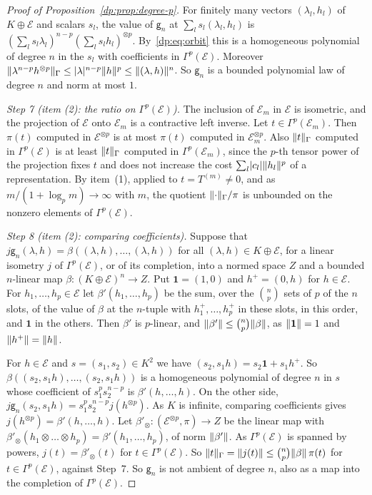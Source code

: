 \begin{proof}[Proof of Proposition~\ref{dp:prop:degree-p}]
For finitely many vectors $(\lambda_l,h_l)$ of $K\oplus\mathcal E$ and scalars $s_l$, the value of $\mathsf g_n$ at $\sum_ls_l(\lambda_l,h_l)$ is $(\sum_ls_l\lambda_l)^{n-p}(\sum_ls_lh_l)^{\otimes p}$. By~\eqref{dp:eq:orbit} this is a homogeneous polynomial of degree $n$ in the $s_l$ with coefficients in $\Gamma^p(\mathcal E)$. Moreover $\lVert \lambda^{n-p}h^{\otimes p}\rVert_\Gamma\le\lvert \lambda\rvert^{n-p}\lVert h\rVert^p\le\lVert (\lambda,h)\rVert^n$. So $\mathsf g_n$ is a bounded polynomial law of degree $n$ and norm at most $1$.

\emph{Step 7 (item (2): the ratio on $\Gamma^p(\mathcal E)$).} The inclusion of $\mathcal E_m$ in $\mathcal E$ is isometric, and the projection of $\mathcal E$ onto $\mathcal E_m$ is a contractive left inverse. Let $t\in\Gamma^p(\mathcal E_m)$. Then $\pi(t)$ computed in $\mathcal E^{\otimes p}$ is at most $\pi(t)$ computed in $\mathcal E_m^{\otimes p}$. Also $\lVert t\rVert_\Gamma$ computed in $\Gamma^p(\mathcal E)$ is at least $\lVert t\rVert_\Gamma$ computed in $\Gamma^p(\mathcal E_m)$, since the $p$-th tensor power of the projection fixes $t$ and does not increase the cost $\sum_l\lvert c_l\rvert\lVert h_l\rVert^p$ of a representation. By item~(1), applied to $t=T^{(m)}\ne0$, and as $m/(1+\log_pm)\to\infty$ with $m$, the quotient $\lVert \cdot\rVert_\Gamma/\pi$ is unbounded on the nonzero elements of $\Gamma^p(\mathcal E)$.

\emph{Step 8 (item (2): comparing coefficients).} Suppose that $j\mathsf g_n(\lambda,h)=\beta((\lambda,h),\dots,(\lambda,h))$ for all $(\lambda,h)\in K\oplus\mathcal E$, for a linear isometry $j$ of $\Gamma^p(\mathcal E)$, or of its completion, into a normed space $Z$ and a bounded $n$\nobreakdash-linear map $\beta\colon(K\oplus\mathcal E)^n\to Z$. Put $\mathbf 1=(1,0)$ and $h^+=(0,h)$ for $h\in\mathcal E$. For $h_1,\dots,h_p\in\mathcal E$ let $\beta'(h_1,\dots,h_p)$ be the sum, over the $\binom np$ sets of $p$ of the $n$ slots, of the value of $\beta$ at the $n$-tuple with $h_1^+,\dots,h_p^+$ in these slots, in this order, and $\mathbf 1$ in the others. Then $\beta'$ is $p$\nobreakdash-linear, and $\lVert \beta'\rVert\le\binom np\lVert \beta\rVert$, as $\lVert \mathbf 1\rVert=1$ and $\lVert h^+\rVert=\lVert h\rVert$.

For $h\in\mathcal E$ and $s=(s_1,s_2)\in K^2$ we have $(s_2,s_1h)=s_2\mathbf 1+s_1h^+$. So $\beta((s_2,s_1h),\dots,(s_2,s_1h))$ is a homogeneous polynomial of degree $n$ in $s$ whose coefficient of $s_1^ps_2^{n-p}$ is $\beta'(h,\dots,h)$. On the other side, $j\mathsf g_n(s_2,s_1h)=s_1^ps_2^{n-p}j(h^{\otimes p})$. As $K$ is infinite, comparing coefficients gives $j(h^{\otimes p})=\beta'(h,\dots,h)$. Let $\beta'_\otimes\colon(\mathcal E^{\otimes p},\pi)\to Z$ be the linear map with $\beta'_\otimes(h_1\otimes\dots\otimes h_p)=\beta'(h_1,\dots,h_p)$, of norm $\lVert \beta'\rVert$. As $\Gamma^p(\mathcal E)$ is spanned by powers, $j(t)=\beta'_\otimes(t)$ for $t\in\Gamma^p(\mathcal E)$. So $\lVert t\rVert_\Gamma=\lVert j(t)\rVert\le\binom np\lVert \beta\rVert\,\pi(t)$ for $t\in\Gamma^p(\mathcal E)$, against Step~7. So $\mathsf g_n$ is not ambient of degree $n$, also as a map into the completion of $\Gamma^p(\mathcal E)$.
\end{proof}

